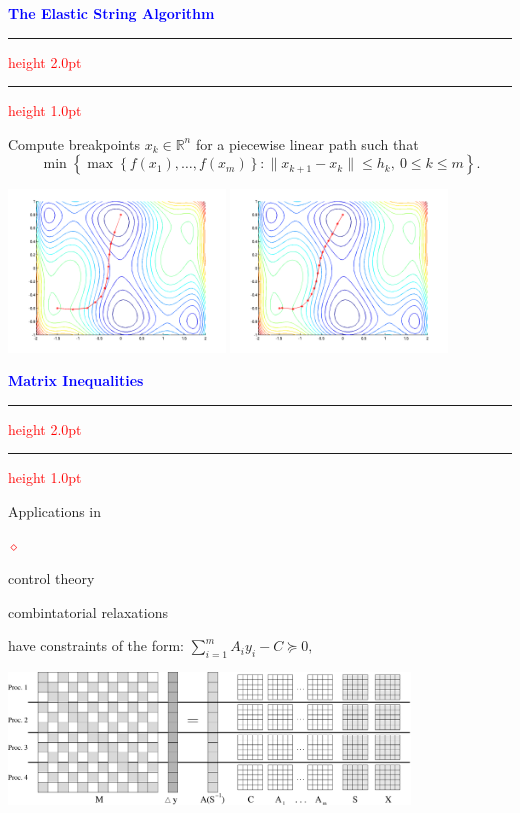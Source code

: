\documentclass{seminar}
\newcommand{\R}{\mbox{${\mathbb R}$}}
\newcommand{\reddiamond}{\textcolor{red}{$\diamond$}}
\newcommand{\redstripe}{\textcolor{red}{\hrule height 2.0pt\hfil}
             \vspace{-1.8pt}
             \textcolor{red}{\hrule height 1.0pt\hfil}
}
\newcommand{\heading}[1]{%
   \centerline{\textcolor{blue}{\textbf{#1}}}%
    \redstripe%
    \bigskip
}
\begin{document}
\begin{slide}

\heading{The Elastic String Algorithm}

Compute breakpoints $ x_k \in \R^n $ for a piecewise linear path such that
\[
\min \left \{ \max \left \{ f (x_1) , \ldots , f(x_m) \right \}
: \| x_{k+1} - x_k \| \le h_k , 
\ 0 \le k \le m \right \} .
\]

\bigskip

\ifpdf
\centerline{
\includegraphics[height=1.7in]{../images/camel10} \hfil
\includegraphics[height=1.7in]{../images/camel15}
}
\else
\fi

\vfill

\end{slide}

\begin{slide}
\heading{Matrix Inequalities}

Applications in
\begin{list}{\reddiamond}{}
\item control theory
\item combintatorial relaxations
\end{list}
have constraints of the form: ${\sum_{i=1}^m A_i y_i - C \succeq 0,}$

\centerline{
\includegraphics[width=0.8\textwidth,height=0.3\textwidth]{datalayout3}
}

\end{slide}
\end{document}
